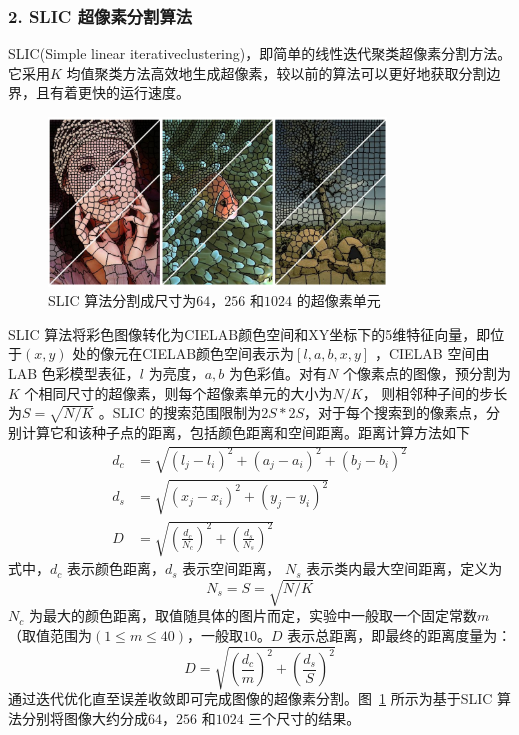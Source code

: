 \subsubsection*{2. SLIC 超像素分割算法}
\label{subsubsec:chap02-1-1-2}
SLIC(Simple linear iterativeclustering)，即简单的线性迭代聚类超像素分割方法。它采用$K$ 均值聚类方法高效地生成超像素，较以前的算法可以更好地获取分割边界，且有着更快的运行速度。

\begin{figure}[htb]
  \centering
  \includegraphics[width=0.8\textwidth]{figures/slic}
  \caption{SLIC 算法分割成尺寸为$64$，$256$ 和$1024$ 的超像素单元}\label{fig:slic}
\end{figure}

SLIC 算法将彩色图像转化为CIELAB颜色空间和XY坐标下的5维特征向量，即位于$(x,y)$ 处的像元在CIELAB颜色空间表示为$[l,a,b,x,y]$ ，CIELAB 空间由LAB 色彩模型表征，$l$ 为亮度，$a,b$ 为色彩值。对有$N$ 个像素点的图像，预分割为$K$ 个相同尺寸的超像素，则每个超像素单元的大小为$N/ K$， 则相邻种子间的步长为$S = \sqrt{N/K}$ 。SLIC 的搜索范围限制为$2S*2S$，对于每个搜索到的像素点，分别计算它和该种子点的距离，包括颜色距离和空间距离。距离计算方法如下
\begin{equation}
  \label{eq:2-5}
  \begin{split}
    d_c &= \sqrt{(l_j-l_i)^2 + (a_j-a_i)^2 + (b_j - b_i)^2} \\
    d_s &= \sqrt{(x_j-x_i)^2 + (y_j-y_i)^2} \\
    D &= \sqrt{(\frac{d_c}{N_c})^2 + (\frac{d_s}{N_s})^2}
  \end{split}
\end{equation}
式中，$d_c$ 表示颜色距离，$d_s$ 表示空间距离， $N_s$ 表示类内最大空间距离，定义为
\begin{equation}
  \label{eq:2-6}
  N_s = S = \sqrt{N/K}
\end{equation}
$N_c$ 为最大的颜色距离，取值随具体的图片而定，实验中一般取一个固定常数$m$ （取值范围为$(1\leq m \leq 40)$，一般取$10$。$D$ 表示总距离，即最终的距离度量为：
\begin{equation}
  \label{eq:2-7}
  D = \sqrt{(\frac{d_c}{m})^2 + (\frac{d_s}{S})^2}
\end{equation}
通过迭代优化直至误差收敛即可完成图像的超像素分割。图~\ref{fig:slic} 所示为基于SLIC 算法分别将图像大约分成$64$，$256$ 和$1024$ 三个尺寸的结果。



